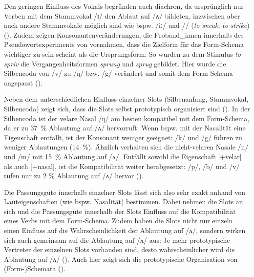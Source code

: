 Den geringen Einfluss des Vokals begründen \textcite{Bybee.1983} auch diachron, da ursprünglich nur Verben mit dem Stammvokal /ɪ/ den Ablaut auf /ʌ/ bildeten, inzwischen aber auch andere Stammvokale möglich sind wie bspw. /iː/ und /{}/ (\textit{to sneak}, \textit{to strike}) (\cite[255]{Bybee.1983}). Zudem zeigen Konsonantenveränderungen, die Proband\_innen innerhalb des Pseudowortexperiments von \textcite{Bybee.1983} vornahmen, dass die Zielform für das Form-Schema wichtiger zu sein scheint als die Ursprungsform: So wurden zu dem Stimulus \textit{to spriv} die Vergangenheitsformen \textit{sprung} und \textit{sprug} gebildet. Hier wurde die Silbencoda von /v/ zu /ŋ/ bzw. /g/ verändert und somit dem Form-Schema angepasst (\cite[263]{Bybee.1983}).



Neben dem unterschiedlichen Einfluss einzelner Slots (Silbenanfang, Stammvokal, Silbencoda) zeigt sich, dass die Slots selbst prototypisch organisiert sind (\cite[260]{Bybee.1983}). In der Silbencoda ist der velare Nasal /ŋ/ am besten kompatibel mit dem Form-Schema, da er zu 37~\% Ablautung auf /ʌ/ hervorruft. Wenn bspw. mit der Nasalität eine Eigenschaft entfällt, ist der Konsonant weniger geeignet: /k/ und /g/ führen zu weniger Ablautungen (14~\%). Ähnlich verhalten sich die nicht-velaren Nasale /n/ und /m/ mit 15~\% Ablautung auf /ʌ/. Entfällt sowohl die Eigenschaft [+velar] als auch [+nasal], ist die Kompatibilität weiter herabgesetzt: /p/, /b/ und /v/ rufen nur zu 2 \% Ablautung auf /ʌ/ hervor (\cite[260]{Bybee.1983}). 



Die Passungsgüte innerhalb einzelner Slots lässt sich also sehr exakt anhand von Lauteigenschaften (wie bspw. Nasalität) bestimmen. Dabei nehmen die Slots an sich und die Passungsgüte innerhalb der Slots Einfluss auf die Kompatibilität eines Verbs mit dem Form-Schema. Zudem haben die Slots nicht nur einzeln einen Einfluss auf die Wahrscheinlichkeit der Ablautung auf /ʌ/, sondern wirken sich auch gemeinsam auf die Ablautung auf /ʌ/ aus: Je mehr prototypische Vertreter der einzelnen Slots vorhanden sind, desto wahrscheinlicher wird die Ablautung auf /ʌ/ (\cite[261--261]{Bybee.1983}). Auch hier zeigt sich die prototypische Organisation von (Form-)Schemata (\cite[135]{Bybee.1988}). 



